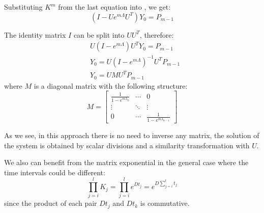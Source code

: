 Substituting $K^m$ from the last equation into , we get:
\[
  (I - U e^{m \Lambda} U^T) Y_0 = P_{m - 1}
\]

The identity matrix $I$ can be split into $U U^T$, therefore:
\begin{align*}
  & U (I - e^{m \Lambda}) U^T Y_0 = P_{m - 1} \\
  & Y_0 = U (I - e^{m \Lambda})^{-1} U^T P_{m - 1} \\
  & Y_0 = U M U^T P_{m - 1}
\end{align*}
where $M$ is a diagonal matrix with the following structure:
\[
  M = \left[
    \begin{array}{ccc}
      \frac{1}{1 - e^{m \lambda_0}} & \cdots & 0 \\
      \vdots & \ddots & \vdots \\
      0 & \cdots & \frac{1}{1 - e^{m \lambda_{n - 1}}}
    \end{array}
  \right]
\]

As we see, in this approach there is no need to inverse any matrix, the solution of the system is obtained by scalar divisions and a similarity transformation with $U$.

We also can benefit from the matrix exponential in the general case where the time intervals could be different:
\[
  \prod_{j = i}^l K_j = \prod_{j = i}^l e^{D t_j} = e^{D \sum_{j = i}^l t_j}
\]
since the product of each pair $D t_j$ and $D t_k$ is commutative.

